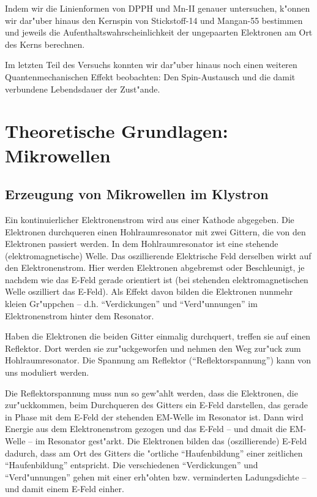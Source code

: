 \documentclass[a4paper,12pt]{article}
\begin{document}
Indem wir die Linienformen von DPPH und Mn-II genauer untersuchen,
k"onnen wir dar"uber hinaus den Kernspin von Stickstoff-14 und
Mangan-55 bestimmen und jeweils die Aufenthaltswahrscheinlichkeit der
ungepaarten Elektronen am Ort des Kerns berechnen.

Im letzten Teil des Versuchs konnten wir dar"uber hinaus noch einen
weiteren Quantenmechanischen Effekt beobachten: Den Spin-Austausch und
die damit verbundene Lebendsdauer der Zust"ande.




\clearpage
\tableofcontents
\clearpage


\section{Theoretische Grundlagen: Mikrowellen}
\label{sec:theor_grundl_mikr}


\subsection{Erzeugung von Mikrowellen im Klystron}
\label{sec:erze_von_mikr_im_klystr}


Ein kontinuierlicher Elektronenstrom wird aus einer Kathode
abgegeben. Die Elektronen durchqueren einen Hohlraumresonator mit zwei
Gittern, die von den Elektronen passiert werden. In dem
Hohlraumresonator ist eine stehende (elektromagnetische) Welle. Das
oszillierende Elektrische Feld derselben wirkt auf den
Elektronenstrom. Hier werden Elektronen abgebremst oder Beschleunigt,
je nachdem wie das E-Feld gerade orientiert ist (bei stehenden
elektromagnetischen Welle oszilliert das E-Feld). Als Effekt davon
bilden die Elektronen nunmehr kleien Gr"uppchen --
d.h. "`Verdickungen"' und "`Verd"unnungen"' im Elektronenstrom hinter
dem Resonator.

Haben die Elektronen die beiden Gitter einmalig durchquert, treffen
sie auf einen Reflektor. Dort werden sie zur"uckgeworfen und nehmen
den Weg zur"uck zum Hohlraumresonator. Die Spannung am Reflektor
("`Reflektorspannung"') kann von uns moduliert werden.

Die Reflektorspannung muss nun so gew"ahlt werden, dass die
Elektronen, die zur"uckkommen, beim Durchqueren des Gitters ein E-Feld
darstellen, das gerade in Phase mit dem E-Feld der stehenden EM-Welle
im Resonator ist. Dann wird Energie aus dem Elektronenstrom gezogen
und das E-Feld -- und dmait die EM-Welle -- im Resonator
gest"arkt. Die Elektronen bilden das (oszillierende) E-Feld dadurch,
dass am Ort des Gitters die "ortliche "`Haufenbildung"' einer
zeitlichen "`Haufenbildung"' entspricht. Die verschiedenen
"`Verdickungen"' und "`Verd"unnungen"' gehen mit einer erh"ohten
bzw. verminderten Ladungsdichte -- und damit einem E-Feld einher.
\end{document}
